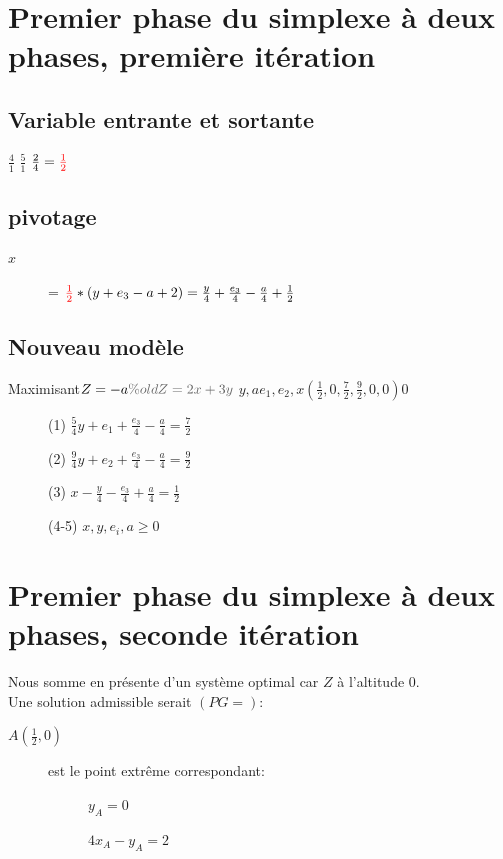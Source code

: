 \section{Premier phase du simplexe à deux phases, première itération}
\subsection{Variable entrante et sortante}
  {$\frac{4}{1}$}
  {$\frac{5}{1}$}
  {$\frac{2}{4} = \textcolor{red}{\frac{1}{2}}$}

\subsection{pivotage}
\begin{description}
\item[$x$] = $\textcolor{red}{\frac{1}{2}}*(y+ e_3 -a +2) = \frac{y}{4} + \frac{e_3}{4} - \frac{a}{4} + \frac{1}{2}$
\end{description}

\subsection{Nouveau modèle}
        {Maximisant}{$Z = -a \\ \cgris{\% oldZ = 2x + 3y}$}
        {$y,a$}{$e_1,e_2,x$}{$(\frac{1}{2},0,\frac{7}{2}, \frac{9}{2}, 0,0)$}{$0$}
        {\begin{description}
\item[] (1) $\frac{5}{4}y + e_1 + \frac{e_3}{4} - \frac{a}{4} = \frac{7}{2}$
\item[] (2) $\frac{9}{4}y + e_2 + \frac{e_3}{4} - \frac{a}{4} = \frac{9}{2}$
\item[] (3) $x - \frac{y}{4} - \frac{e_3}{4} + \frac{a}{4} = \frac{1}{2}$
\item[] (4-5) $x,y,e_i,a \geqslant 0$
\end{description}
}

\section{Premier phase du simplexe à deux phases, seconde itération}
Nous somme en présente d'un système optimal car $Z$ à l'altitude 0.\\
Une solution admissible serait $(PG=)$:
\begin{description}
\item[$A(\frac{1}{2},0)$] est le point extrême correspondant:
\item[] \begin{description}
\item[] $y_A = 0$
\item[] $4x_A - y_A = 2$
\end{description}
\end{description}


